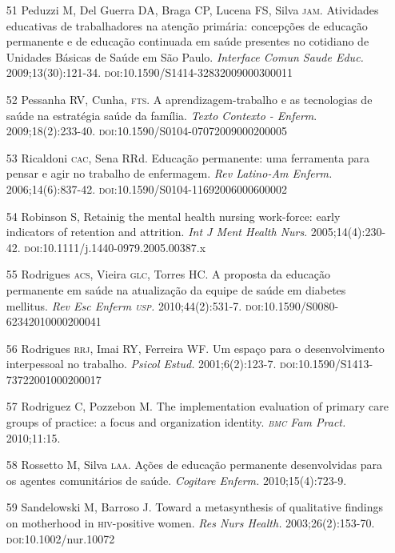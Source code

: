 \documentclass{article}
\begin{document}
\begin{itemize}
\item[51] Peduzzi M, Del Guerra DA, Braga CP, Lucena FS, Silva \textsc{jam}. Atividades
educativas de trabalhadores na atenção primária: concepções de educação
permanente e de educação continuada em saúde presentes no cotidiano de Unidades
Básicas de Saúde em São Paulo. \textit{Interface Comun Saude Educ.}
2009;13(30):121-34. \textsc{doi}:10.1590/S1414-32832009000300011

\item[52] Pessanha RV, Cunha, \textsc{fts}. A aprendizagem-trabalho e as tecnologias de
saúde na estratégia saúde da família. \textit{Texto Contexto - Enferm}. 2009;18(2):233-40. \textsc{doi}:10.1590/S0104-07072009000200005

\item[53] Ricaldoni \textsc{cac}, Sena RRd. Educação permanente: uma ferramenta para
pensar e agir no trabalho de enfermagem. \textit{Rev Latino-Am Enferm.}
2006;14(6):837-42. \textsc{doi}:10.1590/S0104-11692006000600002

\item[54] Robinson S, Retainig the mental health nursing work-force: early
indicators of retention and attrition. \textit{Int J Ment Health Nurs}. 2005;14(4):230-42. \textsc{doi}:10.1111/j.1440-0979.2005.00387.x

\item[55] Rodrigues \textsc{acs}, Vieira \textsc{glc}, Torres HC. A proposta da educação
permanente em saúde na atualização da equipe de saúde em diabetes mellitus.
\textit{Rev Esc Enferm \textsc{usp}.}
2010;44(2):531-7. \textsc{doi}:10.1590/S0080-62342010000200041

\item[56] Rodrigues \textsc{rrj}, Imai RY, Ferreira WF. Um espaço para o desenvolvimento
interpessoal no trabalho. \textit{Psicol Estud.}
2001;6(2):123-7. \textsc{doi}:10.1590/S1413-73722001000200017

\item[57] Rodriguez C, Pozzebon M. The implementation evaluation of primary care
groups of practice: a focus and organization identity. \textit{\textsc{bmc} Fam Pract.}
2010;11:15.

\item[58] Rossetto M, Silva \textsc{laa}. Ações de educação permanente desenvolvidas para
os agentes comunitários de saúde. \textit{Cogitare Enferm.}
2010;15(4):723-9.

\item[59] Sandelowski M, Barroso J. Toward a metasynthesis of qualitative
findings on motherhood in \textsc{hiv}-positive women. \textit{Res Nurs Health.}
2003;26(2):153-70. \textsc{doi}:10.1002/nur.10072


\end{itemize}
\end{document}
